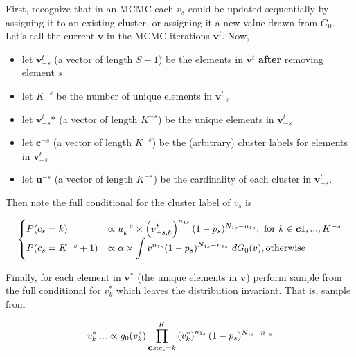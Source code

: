 \documentclass[12pt]{article}
\newcommand{\bc}{\mbox{\boldmath $c$}}
\begin{document}
First, recognize that in an MCMC each $v_s$ could be updated sequentially by assigning it to an existing cluster,
or assigning it a new value drawn from $G_0$. Let's call the current $\bm v$ in the MCMC iterations $\bm v^t$. Now,

\def\vt{\bm v^t}
\def\vstar{ \vt_{-s}\mbox{*} }

\begin{itemize}
  \item let $\vt_{-s}$ (a vector of length $S-1$) be the elements in $\vt$ \textbf{after} removing element $s$
  \item let $K^{-s}$ be the number of unique elements in $\vt_{-s}$ 
  \item let $\vstar$ (a vector of length $K^{-s}$) be the unique elements in $\vt_{-s}$
  \item let $\bm c^{-s}$ (a vector of length $K^{-s}$) be the (arbitrary) cluster labels for elements in $\vt_{-s}$
  \item let $\bm u^{-s}$ (a vector of length $K^{-s}$) be the cardinality of each cluster in $\vt_{-s}$.
\end{itemize}

Then note the full conditional for the cluster label of $v_s$ is 

$$
\begin{cases}
  P(c_s = k) & \propto u^{-s}_k \times \p{v_{-s,k}^{t}}^{n_{1s}} (1-p_s)^{N_{1s}-n_{1s}}, \text{ for } k \in \bc{1,...,K^{-s}}\\
  P(c_s = K^{-s}+1) & \propto \alpha \times \ds\int v^{n_{1s}} (1-p_s)^{N_{1s}-n_{1s}} ~dG_0(v), \text{otherwise}
\end{cases}
$$

Finally, for each element in $\bm v^*$ (the unique elements in $\bm v$) perform sample from the full conditional for $v_k^*$
which leaves the distribution invariant. That is, sample from

$$
v_k^* | ... \propto g_0(v_k^*) \prod_{\bc{s:c_s=k}}^K \p{v_k^*}^{n_{1s}}(1-p_s)^{N_{1s}-n_{1s}}
$$



\end{document}
